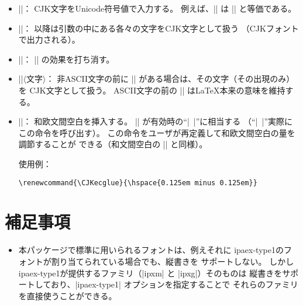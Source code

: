 \documentclass[a4paper]{ltjsarticle}
\newcommand{\Pkg}[1]{\textsf{#1}}
\newcommand{\Meta}[1]{$\langle$\mbox{}#1\mbox{}$\rangle$}
\newcommand{\Means}{：\quad}
\begin{document}
\begin{itemize}
\item |\UTF{|\Meta{16進数字}|}|\Means
  CJK文字をUnicode符号値で入力する。
  例えば、|| は || と等価である。
\item |\CJKforce{|\Meta{文字}…|}|\Means
  以降は引数の中にある各々の文字をCJK文字として扱う
  （CJKフォントで出力される）。
\item
  |\CJKunforce{|\Meta{文字}…|}|\Means
  |\CJKforce| の効果を打ち消す。
\item |\@|\Meta{文字}\Means
  非ASCII文字の前に |\@| がある場合は、その文字（その出現のみ）を
  CJK文字として扱う。
  ASCII文字の前の |\@| は{\LaTeX}本来の意味を維持する。
\item |\CJKecglue|\Means
  和欧文間空白を挿入する。
  |\CJKtilde| が有効時の“|~|”に相当する
  （“|~|”実際にこの命令を呼び出す）。
  この命令をユーザが再定義して和欧文間空白の量を調節することが
  できる（和文間空白の |\CJKglue| と同様）。

  使用例\Means
\begin{verbatim}
\renewcommand{\CJKecglue}{\hspace{0.125em minus 0.125em}}
\end{verbatim}
\end{itemize}

\section{補足事項}
\label{sec:remarks}

\begin{itemize}
\item 本パッケージで標準に用いられるフォントは、例えそれに
  ipaex-type1のフォントが割り当てられている場合でも、縦書きを
  サポートしない。
  しかし\Pkg{ipaex-type1}が提供するファミリ（|ipxm| と |ipxg|）そのものは
  縦書きをサポートしており、|ipaex-type1| オプションを指定することで
  それらのファミリを直接使うことができる。
\end{itemize}

\end{document}
